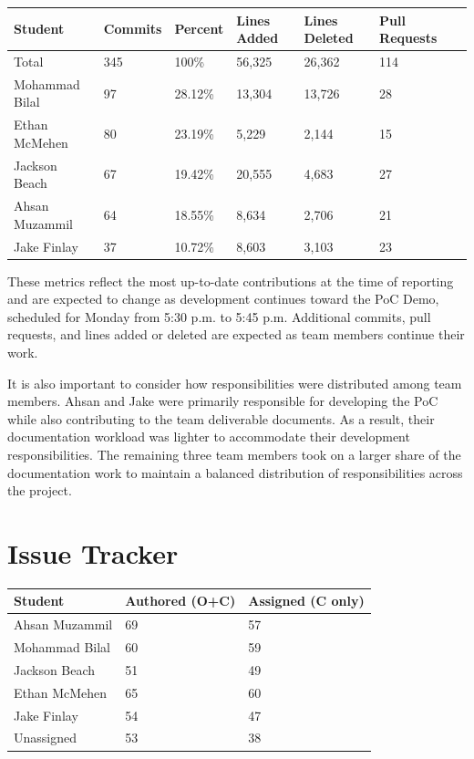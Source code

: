 \documentclass[10pt, titlepage]{article}
\begin{document}
\begin{table}[H]
\centering
\begin{tabular}{lllllll}
\toprule
\textbf{Student} & \textbf{Commits} & \textbf{Percent} & \textbf{Lines Added} &
\textbf{Lines Deleted} & \textbf{Pull Requests}\\
\midrule
Total & 345 & 100\% & 56,325 & 26,362 & 114\\
Mohammad Bilal & 97 & 28.12\% & 13,304 & 13,726 & 28\\
Ethan McMehen & 80 & 23.19\% & 5,229 & 2,144 & 15\\
Jackson Beach & 67 & 19.42\% & 20,555 & 4,683 & 27\\
Ahsan Muzammil & 64 & 18.55\% & 8,634 & 2,706 & 21\\
Jake Finlay & 37 & 10.72\% & 8,603 & 3,103 & 23\\
\bottomrule
\end{tabular}
\end{table}

These metrics reflect the most up-to-date contributions
at the time of reporting and are expected to change as
development continues toward the PoC Demo, scheduled for
Monday from 5:30 p.m. to 5:45 p.m. Additional commits,
pull requests, and lines added or deleted are expected
as team members continue their work.

It is also important to consider how responsibilities
were distributed among team members. Ahsan and Jake
were primarily responsible for developing the PoC while
also contributing to the team deliverable documents.
As a result, their documentation workload was lighter
to accommodate their development responsibilities.
The remaining three team members took on a larger share
of the documentation work to maintain a balanced
distribution of responsibilities across the project.

\section{Issue Tracker}


\begin{table}[H]
\centering
\begin{tabular}{lll}
\toprule
\textbf{Student} & \textbf{Authored (O+C)} & \textbf{Assigned (C only)}\\
\midrule
Ahsan Muzammil & 69 & 57 \\
Mohammad Bilal & 60 & 59 \\
Jackson Beach & 51 & 49 \\
Ethan McMehen & 65 & 60 \\
Jake Finlay & 54 & 47 \\
Unassigned & 53 & 38 \\
\bottomrule
\end{tabular}
\end{table}
\end{document}
